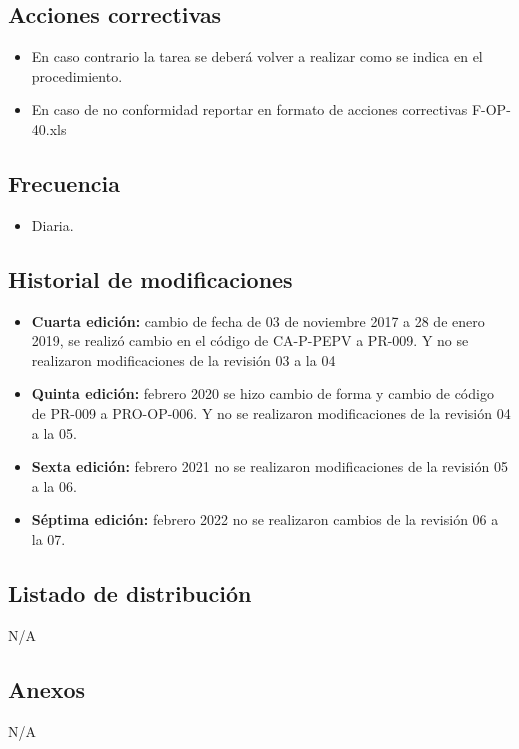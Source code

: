 \subsection{Acciones correctivas}

\begin{itemize}
	\item En caso contrario la tarea se deberá volver a realizar como se indica en el procedimiento.
	\item En caso de no conformidad reportar en formato de acciones correctivas F-OP-40.xls
\end{itemize}

\subsection{Frecuencia}

\begin{itemize}
	\item Diaria.
\end{itemize}

\subsection{Historial de modificaciones}

\begin{itemize}
	\item \textbf{Cuarta edición:} cambio de fecha de 03 de noviembre 2017 a 28 de enero 2019, se realizó cambio en el código de CA-P-PEPV a PR-009. Y no se realizaron modificaciones de la revisión 03 a la 04
	\item \textbf{Quinta edición:} febrero 2020 se hizo cambio de forma y cambio de código de PR-009 a PRO-OP-006. Y no se realizaron modificaciones de la revisión 04 a la 05.
	\item \textbf{Sexta edición:} febrero 2021 no se realizaron modificaciones de la revisión 05 a la 06.
	\item \textbf{Séptima edición:} febrero 2022 no se realizaron cambios de la revisión 06 a la 07.
\end{itemize}

\subsection{Listado de distribución}

N/A

\subsection{Anexos}

N/A
